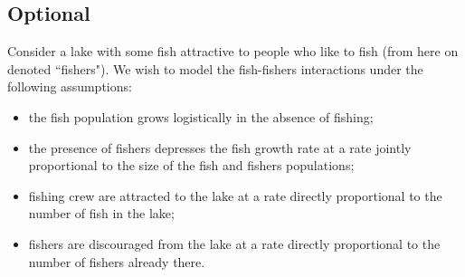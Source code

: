 \documentclass[answers]{exam}
\begin{document}
\begin{questions}



\section*{Optional}
\question%
Consider a lake with some fish attractive to people who like to fish (from here on denoted ``fishers"). We wish to model the fish-fishers interactions under the following assumptions:
\begin{itemize}
	\item the fish population grows logistically in the absence of fishing;
	\item the presence of fishers depresses the fish growth rate at a rate jointly proportional to the size of the fish and fishers populations;
	\item fishing crew are attracted to the lake at a rate directly proportional to the number of fish in the lake;
	\item fishers are discouraged from the lake at a rate directly proportional to the number of fishers already there.
\end{itemize}
\begin{parts}

\end{parts}
\end{questions}
\end{document}
